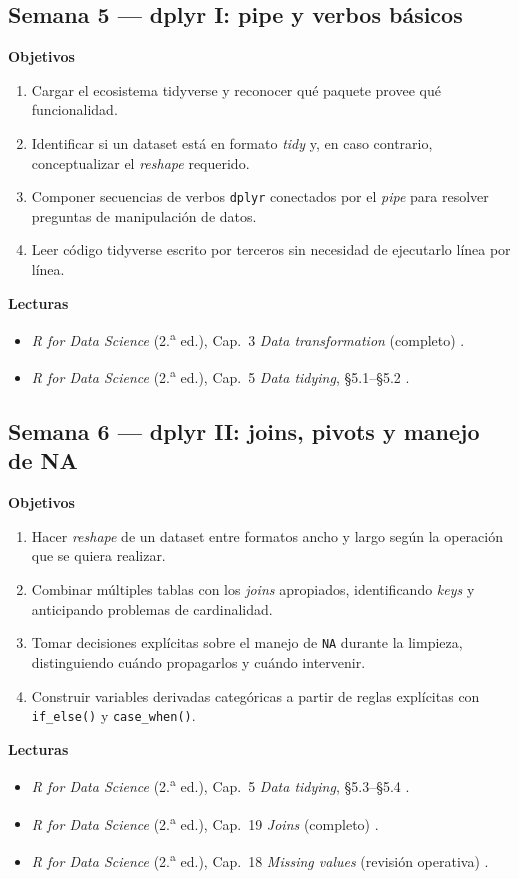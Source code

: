 \documentclass[11pt,letterpaper]{article}
\newcommand{\semanaSucinta}[2]{%
  \subsection*{\color{main}Semana #1 --- #2}%
}
\begin{document}
\semanaSucinta{5}{dplyr I: pipe y verbos básicos}

\noindent\textbf{Objetivos}
\begin{enumerate}[leftmargin=*, itemsep=1pt]
    \item Cargar el ecosistema tidyverse y reconocer qué paquete provee qué funcionalidad.
    \item Identificar si un dataset está en formato \textit{tidy} y, en caso contrario, conceptualizar el \textit{reshape} requerido.
    \item Componer secuencias de verbos \texttt{dplyr} conectados por el \textit{pipe} para resolver preguntas de manipulación de datos.
    \item Leer código tidyverse escrito por terceros sin necesidad de ejecutarlo línea por línea.
\end{enumerate}

\noindent\textbf{Lecturas}
\begin{itemize}[leftmargin=*, itemsep=1pt]
    \item \textit{R for Data Science} (2.\textsuperscript{a} ed.), Cap.\ 3 \textit{Data transformation} (completo) \cite{wickham2023r4ds}.
    \item \textit{R for Data Science} (2.\textsuperscript{a} ed.), Cap.\ 5 \textit{Data tidying}, §5.1--§5.2 \cite{wickham2023r4ds}.
\end{itemize}

\semanaSucinta{6}{dplyr II: joins, pivots y manejo de NA}

\noindent\textbf{Objetivos}
\begin{enumerate}[leftmargin=*, itemsep=1pt]
    \item Hacer \textit{reshape} de un dataset entre formatos ancho y largo según la operación que se quiera realizar.
    \item Combinar múltiples tablas con los \textit{joins} apropiados, identificando \textit{keys} y anticipando problemas de cardinalidad.
    \item Tomar decisiones explícitas sobre el manejo de \texttt{NA} durante la limpieza, distinguiendo cuándo propagarlos y cuándo intervenir.
    \item Construir variables derivadas categóricas a partir de reglas explícitas con \texttt{if\_else()} y \texttt{case\_when()}.
\end{enumerate}

\noindent\textbf{Lecturas}
\begin{itemize}[leftmargin=*, itemsep=1pt]
    \item \textit{R for Data Science} (2.\textsuperscript{a} ed.), Cap.\ 5 \textit{Data tidying}, §5.3--§5.4 \cite{wickham2023r4ds}.
    \item \textit{R for Data Science} (2.\textsuperscript{a} ed.), Cap.\ 19 \textit{Joins} (completo) \cite{wickham2023r4ds}.
    \item \textit{R for Data Science} (2.\textsuperscript{a} ed.), Cap.\ 18 \textit{Missing values} (revisión operativa) \cite{wickham2023r4ds}.
\end{itemize}
\end{document}
